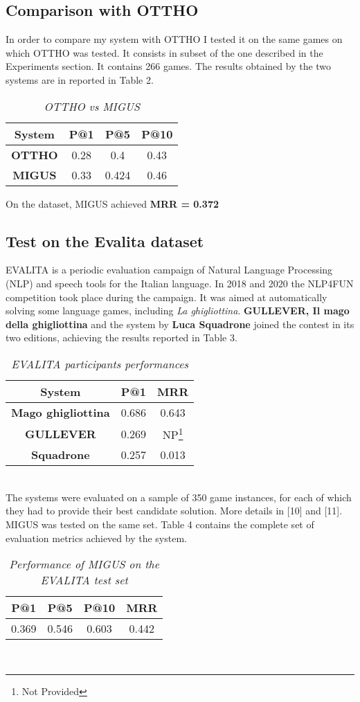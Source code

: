 \documentclass[twoside,twocolumn]{article}
\begin{document}
	\subsection{Comparison with OTTHO}
	In order to compare my system with OTTHO I tested it on the same games on which OTTHO was tested. It consists in subset of the one described in the Experiments section. It contains 266 games. The results obtained by the two systems are in reported in Table 2.
	\begin{table}[h!]
	\centering
	\begin{tabular}{| c c c c |}
	\hline
	System & P@1 & P@5 & P@10 \\ [0.5ex]
	\hline \hline
	\textbf{OTTHO} & 0.28 & 0.4 & 0.43 \\
	\textbf{MIGUS} & 0.33 & 0.424 & 0.46 \\
	\hline
	\end{tabular}
	\caption{\textit{OTTHO vs MIGUS}}
	\end{table}
	On the dataset, MIGUS achieved \textbf{MRR = 0.372}
	\subsection{Test on the Evalita dataset}
	EVALITA is a periodic evaluation campaign of Natural Language Processing (NLP) and speech tools for the Italian language. In 2018 and 2020 the NLP4FUN competition took place during the campaign. It was aimed at automatically solving some language games, including \textit{La ghigliottina}. \textbf{GULLEVER, Il mago della ghigliottina} and the system by \textbf{Luca Squadrone} joined the contest in its two editions, achieving the results reported in Table 3.
	\begin{table}[h!]
	\centering
	\begin{tabular}{| c c c |}
	\hline
	System & P@1 & MRR \\ [0.5ex]
	\hline \hline
	\textbf{Mago ghigliottina} &  0.686 & 0.643 \\
	\textbf{GULLEVER} & 0.269 & NP\footnote{Not Provided} \\
	\textbf{Squadrone} & 0.257 & 0.013 \\
	\hline
	\end{tabular}
	\caption{\textit{EVALITA participants performances}}
	\end{table} \\
	The systems were evaluated on a sample of 350 game instances, for each of which they had to provide their best candidate solution. More details in [10] and [11]. MIGUS was tested on the same set. Table 4 contains the complete set of evaluation metrics achieved by the system.
	\begin{table}[h!]
	\centering
	\begin{tabular}{| c c c c |}
	\hline
	P@1 & P@5 & P@10 & MRR \\ [0.5ex]
	\hline \hline
	0.369 & 0.546 & 0.603 & 0.442 \\
	\hline
	\end{tabular}
	\caption{\textit{Performance of MIGUS on the EVALITA test set}}
	\end{table} \\
\end{document}
